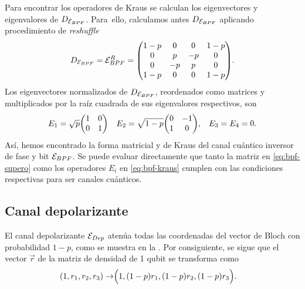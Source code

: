 Para encontrar los operadores de Kraus se calculan los eigenvectores
y eigenvalores de $D_{\mathcal{E}_{BPF}}$. Para~ello, calculamos antes
$D_{\mathcal{E}_{BPF}}$ aplicando procedimiento de \textit{reshuffle}
\begin{align}
  D_{\E_{BPF}}=\E_{BPF}^R=
  \mqty(
	 1-p & 0 & 0 & 1-p \\
	 0 & p & -p & 0 \\
	 0 & -p & p & 0 \\
	 1-p & 0 & 0 & 1-p
  ).
  \label{eq:Choi-E_bpf}
\end{align}
Los eigenvectores normalizados de $D_{\mathcal{E}_{BPF}}$, 
reordenados como matrices y multiplicados por 
la raíz cuadrada de sus eigenvalores respectivos, son
\begin{align}
E_1&=
\sqrt{p}
\mqty(
1 & 0\\
0 & 1
)&
E_2&=
\sqrt{1-p}
\mqty(
0 & -1\\
1 & 0
),
&E_3=E_4=0.
\label{eq:bpf-kraus}
\end{align}
Así, hemos encontrado la forma matricial y de Kraus del canal
cuántico inversor de fase y bit $\mathcal{E}_{BPF}$. Se puede evaluar directamente que 
tanto la matriz en \eqref{eq:bpf-supero} como los operadores $E_i$
en \eqref{eq:bpf-kraus} cumplen con las condiciones respectivas
para ser canales cuánticos.

\subsection{Canal depolarizante}
El canal depolarizante $\mathcal{E}_{Dep}$ 
atenúa todas las coordenadas 
del vector de Bloch con probabilidad $1-p$, como se muestra
en la . Por consiguiente, 
se sigue que el vector $\vec{r}$ de la matriz 
de densidad de 1 qubit se transforma como
\begin{align}
\qty(1,r_1,r_2,r_3)\rightarrow&\Big(1,\qty(1-p)r_1,\qty(1-p)r_2,\qty(1-p)r_3\Big).
\label{eq:depolarizing-bloch-vec}
\end{align}

